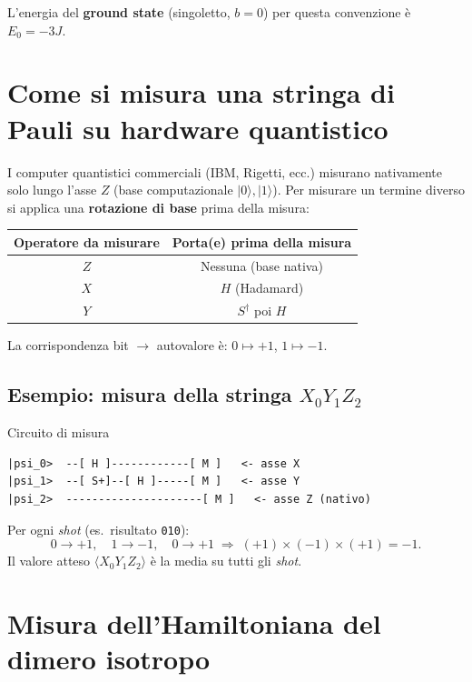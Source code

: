 \documentclass[11pt,a4paper]{article}
\begin{document}
L'energia del \textbf{ground state} (singoletto, $b=0$) per questa
convenzione è $E_0=-3J$.

\section{Come si misura una stringa di Pauli su hardware quantistico}

I computer quantistici commerciali (IBM, Rigetti, ecc.) misurano
nativamente solo lungo l'asse $Z$ (base computazionale
$|0\rangle,|1\rangle$). Per misurare un termine diverso si applica una
\textbf{rotazione di base} prima della misura:

\begin{center}
\renewcommand{\arraystretch}{1.25}
\begin{tabular}{@{}cc@{}}
\toprule
\rowcolor{inkblue!10}
\textbf{Operatore da misurare} & \textbf{Porta(e) prima della misura}\\
\midrule
$Z$ & Nessuna (base nativa)\\
$X$ & $H$ (Hadamard)\\
$Y$ & $S^\dagger$ poi $H$\\
\bottomrule
\end{tabular}
\end{center}

La corrispondenza bit $\to$ autovalore è: $0\mapsto+1$, $1\mapsto-1$.

\subsection*{Esempio: misura della stringa $X_0Y_1Z_2$}

\begin{panelbox}{Circuito di misura}
\begin{verbatim}
|psi_0>  --[ H ]------------[ M ]   <- asse X
|psi_1>  --[ S+]--[ H ]-----[ M ]   <- asse Y
|psi_2>  ---------------------[ M ]   <- asse Z (nativo)
\end{verbatim}
\end{panelbox}

Per ogni \emph{shot} (es.\ risultato \texttt{010}):
$$0\to+1,\quad 1\to-1,\quad 0\to+1 \;\Longrightarrow\; (+1)\times(-1)\times(+1)=-1.$$
Il valore atteso $\langle X_0Y_1Z_2\rangle$ è la media su tutti gli
\emph{shot}.

\section{Misura dell'Hamiltoniana del dimero isotropo}
\end{document}
